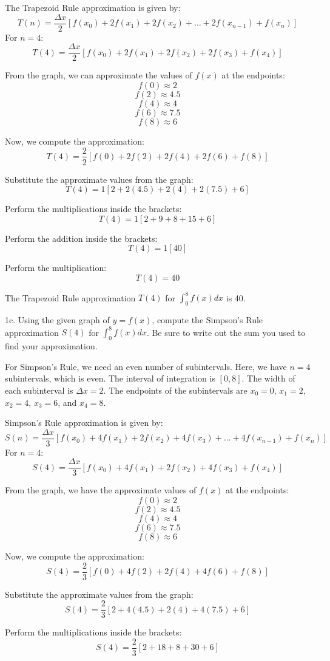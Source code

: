 \documentclass{article}
\begin{document}
The Trapezoid Rule approximation is given by:
$$ T(n) = \frac{\Delta x}{2} [f(x_0) + 2f(x_1) + 2f(x_2) + \dots + 2f(x_{n-1}) + f(x_n)] $$
For $n=4$:
$$ T(4) = \frac{\Delta x}{2} [f(x_0) + 2f(x_1) + 2f(x_2) + 2f(x_3) + f(x_4)] $$

From the graph, we can approximate the values of $f(x)$ at the endpoints:
$$ f(0) \approx 2 $$
$$ f(2) \approx 4.5 $$
$$ f(4) \approx 4 $$
$$ f(6) \approx 7.5 $$
$$ f(8) \approx 6 $$

Now, we compute the approximation:
$$ T(4) = \frac{2}{2} [f(0) + 2f(2) + 2f(4) + 2f(6) + f(8)] $$

Substitute the approximate values from the graph:
$$ T(4) = 1 [2 + 2(4.5) + 2(4) + 2(7.5) + 6] $$

Perform the multiplications inside the brackets:
$$ T(4) = 1 [2 + 9 + 8 + 15 + 6] $$

Perform the addition inside the brackets:
$$ T(4) = 1 [40] $$

Perform the multiplication:
$$ T(4) = 40 $$

The Trapezoid Rule approximation $T(4)$ for $\int_{0}^{8} f(x)dx$ is 40.

1c. Using the given graph of $y = f(x)$, compute the Simpson's Rule approximation $S(4)$ for $\int_{0}^{8} f(x)dx$. Be sure to write out the sum you used to find your approximation.

For Simpson's Rule, we need an even number of subintervals. Here, we have $n=4$ subintervals, which is even.
The interval of integration is $[0, 8]$.
The width of each subinterval is $\Delta x = 2$.
The endpoints of the subintervals are $x_0=0$, $x_1=2$, $x_2=4$, $x_3=6$, and $x_4=8$.

Simpson's Rule approximation is given by:
$$ S(n) = \frac{\Delta x}{3} [f(x_0) + 4f(x_1) + 2f(x_2) + 4f(x_3) + \dots + 4f(x_{n-1}) + f(x_n)] $$
For $n=4$:
$$ S(4) = \frac{\Delta x}{3} [f(x_0) + 4f(x_1) + 2f(x_2) + 4f(x_3) + f(x_4)] $$

From the graph, we have the approximate values of $f(x)$ at the endpoints:
$$ f(0) \approx 2 $$
$$ f(2) \approx 4.5 $$
$$ f(4) \approx 4 $$
$$ f(6) \approx 7.5 $$
$$ f(8) \approx 6 $$

Now, we compute the approximation:
$$ S(4) = \frac{2}{3} [f(0) + 4f(2) + 2f(4) + 4f(6) + f(8)] $$

Substitute the approximate values from the graph:
$$ S(4) = \frac{2}{3} [2 + 4(4.5) + 2(4) + 4(7.5) + 6] $$

Perform the multiplications inside the brackets:
$$ S(4) = \frac{2}{3} [2 + 18 + 8 + 30 + 6] $$
\end{document}
